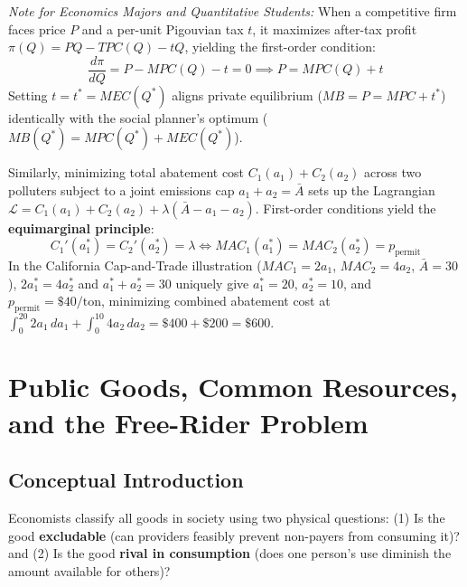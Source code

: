 \documentclass[11pt,letterpaper]{article}
\begin{document}
\begin{tcolorbox}[colback=CourseBlue!5!white,colframe=SlateBlue,title=\textbf{Optional Advanced Section: Equimarginal Abatement and Corrective Tax Optimality}]
\small
\emph{Note for Economics Majors and Quantitative Students:}
When a competitive firm faces price $P$ and a per-unit Pigouvian tax $t$, it maximizes after-tax profit $\pi(Q) = PQ - TPC(Q) - tQ$, yielding the first-order condition:
\[
\frac{d\pi}{dQ} = P - MPC(Q) - t = 0 \implies P = MPC(Q) + t
\]
Setting $t = t^* = MEC(Q^*)$ aligns private equilibrium ($MB = P = MPC + t^*$) identically with the social planner's optimum ($MB(Q^*) = MPC(Q^*) + MEC(Q^*)$).

Similarly, minimizing total abatement cost $C_1(a_1) + C_2(a_2)$ across two polluters subject to a joint emissions cap $a_1 + a_2 = \bar{A}$ sets up the Lagrangian $\mathcal{L} = C_1(a_1) + C_2(a_2) + \lambda(\bar{A} - a_1 - a_2)$. First-order conditions yield the \textbf{equimarginal principle}:
\[
C_1'(a_1^*) = C_2'(a_2^*) = \lambda \iff MAC_1(a_1^*) = MAC_2(a_2^*) = p_{\text{permit}}
\]
In the California Cap-and-Trade illustration ($MAC_1 = 2a_1$, $MAC_2 = 4a_2$, $\bar{A} = 30$), $2a_1^* = 4a_2^*$ and $a_1^* + a_2^* = 30$ uniquely give $a_1^* = 20$, $a_2^* = 10$, and $p_{\text{permit}} = \$40/\text{ton}$, minimizing combined abatement cost at $\int_0^{20} 2a_1\,da_1 + \int_0^{10} 4a_2\,da_2 = \$400 + \$200 = \$600$.
\end{tcolorbox}

\section{Public Goods, Common Resources, and the Free-Rider Problem}

\subsection*{Conceptual Introduction}
Economists classify all goods in society using two physical questions: (1) Is the good \textbf{excludable} (can providers feasibly prevent non-payers from consuming it)? and (2) Is the good \textbf{rival in consumption} (does one person's use diminish the amount available for others)?
\end{document}
